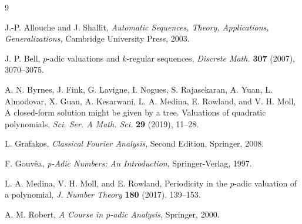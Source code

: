 \documentclass[12pt]{article}
\begin{document}
\begin{thebibliography}{9}

J.-P. Allouche and J. Shallit, \textit{Automatic Sequences, Theory,
Applications, Generalizations,} Cambridge University Press, 
2003.

J. P. Bell, $p$-adic valuations and $k$-regular sequences,
\textit{Discrete Math.} \textbf{307} (2007), 3070--3075.

A. N. Byrnes, J. Fink, G. Lavigne, I. Nogues,
S. Rajasekaran, A. Yuan, L. Almodovar, X. Guan,
A. Kesarwani, L. A. Medina, E. Rowland, and V. H. Moll,
A closed-form solution might be given by a tree. 
Valuations of quadratic polynomials,
\textit{Sci. Ser. A Math. Sci.} \textbf{29} (2019), 11--28.

L. Grafakos,
\textit{Classical Fourier Analysis}, Second Edition,
Springer, 2008.

F. Gouv\^{e}a,
\textit{p-Adic Numbers: An Introduction},
Springer-Verlag, 1997.

L. A. Medina, V. H. Moll, and E. Rowland,
Periodicity in the $p$-adic valuation of a polynomial,
\textit{J. Number Theory} \textbf{180} (2017), 139--153.

A. M. Robert, \textit{A Course in p-adic Analysis}, Springer, 2000.
\end{thebibliography}
\end{document}
